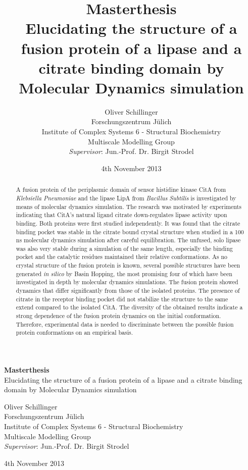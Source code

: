 \documentclass[english, a4paper, 12pt, notitlepage, final]{article}
\title{\textbf{Masterthesis} \\
Elucidating the structure of a fusion protein of a lipase and a citrate binding domain by Molecular Dynamics simulation
}
\author{
Oliver Schillinger \\
Forschungszentrum J\"ulich \\ Institute of Complex Systems 6 - Structural Biochemistry \\ Multiscale Modelling Group \\
\textit{Supervisor}: Jun.-Prof. Dr. Birgit Strodel
}
\date{4th November 2013}
\begin{document}

\begin{center}
{\huge \textbf{Masterthesis} \\}
\vspace {1cm}
{\large Elucidating the structure of a fusion protein of a lipase and a citrate binding domain by Molecular Dynamics simulation \\
}

\vspace{1cm}
Oliver Schillinger \\
Forschungszentrum J\"ulich \\ Institute of Complex Systems 6 - Structural Biochemistry \\ Multiscale Modelling Group \\
\textit{Supervisor}: Jun.-Prof. Dr. Birgit Strodel

4th November 2013

\end{center}
 


\begin{abstract}

A fusion protein of the periplasmic domain of sensor histidine kinase CitA from \textit{Klebsiella Pneumoniae} and the lipase LipA from \textit{Bacillus Subtilis} is investigated by means of molecular dynamics simulation.
The research was motivated by experiments indicating that CitA's natural ligand citrate down-regulates lipase activity upon binding.
Both proteins were first studied independently.
It was found that the citrate binding pocket was stable in the citrate bound crystal structure when studied in a 100 ns molecular dynamics simulation after careful equilibration.
The unfused, solo lipase was also very stable during a simulation of the same length, especially the binding pocket and the catalytic residues maintained their relative conformations.
As no crystal structure of the fusion protein is known, several possible structures have been generated \emph{in silico} by Basin Hopping, the most promising four of which have been investigated in depth by molecular dynamics simulations.
The fusion protein showed dynamics that differ significantly from those of the isolated proteins.
The presence of citrate in the receptor binding pocket did not stabilize the structure to the same extend compared to the isolated CitA.
The diversity of the obtained results indicate a strong dependence of the fusion protein dynamics on the initial conformation.
Therefore, experimental data is needed to discriminate between the possible fusion protein conformations on an empirical basis.

\end{abstract} 
\end{document}
